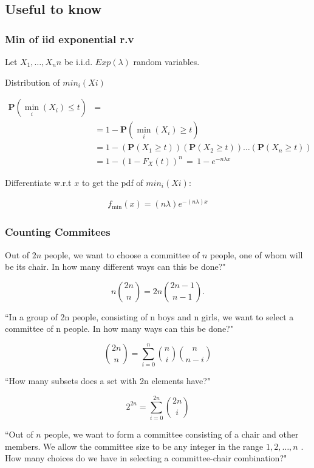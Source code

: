 \subsection{Useful to know}

\subsubsection{Min of iid exponential r.v}
Let  $X_1,…,X_nn$  be i.i.d. $Exp(\lambda)$ random variables.

Distribution of $min_i(Xi)$ 

\begin{align*}
   \mathbf{P}(\min _ i (X_ i)\leq t) &=\\
&=1-\mathbf{P}(\min _ i (X_ i)\geq t)\\
&=1-(\mathbf{P}(X_1\geq t))(\mathbf{P}(X_2\geq t))\ldots (\mathbf{P}(X_ n\geq t))\\
&=1-(1-F_ X(t))^ n \, =\, 1-e^{-n\lambda x}
\end{align*}

Differentiate w.r.t $x$ to get the pdf of $min_i(Xi)$:

\begin{align*}
f_{\text {min}}(x)= (n\lambda ) e^{-(n\lambda ) x}
\end{align*}

\subsubsection{Counting Commitees}

Out of  $2n$  people, we want to choose a committee of $n$ people, one of whom will be its chair. In how many different ways can this be done?" 

$$n\binom {2n}{n}=2n\binom {2n-1}{n-1}.$$

“In a group of  2n  people, consisting of  n  boys and  n  girls, we want to select a committee of  n  people. In how many ways can this be done?"

$$\binom {2n}{n}=\sum _{i=0}^ n \binom {n}{i}\binom {n}{n-i}$$

“How many subsets does a set with  2n  elements have?" 

$$2^{2n}=\sum _{i=0}^{2n}\binom {2n}{i}$$

“Out of  $n$  people, we want to form a committee consisting of a chair and other members. We allow the committee size to be any integer in the range  $1,2,…,n$ . How many choices do we have in selecting a committee-chair combination?"

